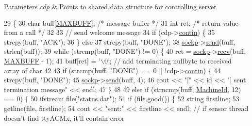 \begin{DoxyParams}{Parameters}
{\em cdp} & Points to shared data structure for controlling server \\
\hline
\end{DoxyParams}

\begin{DoxyCode}
29                                           \{
30   \textcolor{keywordtype}{char} buff[\hyperlink{Worker_8cpp_a0c8dad16ba61ded55d3f302a616c0ced}{MAXBUFF}]; \textcolor{comment}{/* message buffer */}
31   \textcolor{keywordtype}{int} ret; \textcolor{comment}{/* return value from a call */}
32 
33   \textcolor{comment}{// send welcome message}
34   \textcolor{keywordflow}{if} (cdp->\hyperlink{structControlData_ac8fbf80345423cf5650ae64bfb10dc88}{contin}) \{
35     strcpy(buff, \textcolor{stringliteral}{"ACK"});
36   \} \textcolor{keywordflow}{else}
37     strcpy(buff, \textcolor{stringliteral}{"DONE"});
38   \hyperlink{classWorker_a4562eb405aea20c7ac8a552e2075898f}{sockp}->\hyperlink{classSocket_aca3e5b9c5459a50bd8fb03d29ef9e48e}{send}(buff, strlen(buff));
39   \textcolor{keywordflow}{while} (strcmp(buff, \textcolor{stringliteral}{"DONE"}) != 0) \{
40     ret = \hyperlink{classWorker_a4562eb405aea20c7ac8a552e2075898f}{sockp}->\hyperlink{classSocket_a1830972b26797cde234054f81f0921de}{recv}(buff, \hyperlink{Worker_8cpp_a0c8dad16ba61ded55d3f302a616c0ced}{MAXBUFF} - 1);
41     buff[ret] = \textcolor{charliteral}{'\(\backslash\)0'}; \textcolor{comment}{// add terminating nullbyte to received array of char}
42 
43     \textcolor{keywordflow}{if} (strcmp(buff, \textcolor{stringliteral}{"DONE"}) == 0 || !cdp->\hyperlink{structControlData_ac8fbf80345423cf5650ae64bfb10dc88}{contin}) \{
44       strcpy(buff, \textcolor{stringliteral}{"DONE"});
45       \hyperlink{classWorker_a4562eb405aea20c7ac8a552e2075898f}{sockp}->\hyperlink{classSocket_aca3e5b9c5459a50bd8fb03d29ef9e48e}{send}(buff, 4);
46       cout << \textcolor{stringliteral}{"["} << \textcolor{keywordtype}{id} << \textcolor{stringliteral}{"] sent termination message"} << endl;
47     \}
48 
49     \textcolor{keywordflow}{else} \textcolor{keywordflow}{if} (strncmp(buff, \hyperlink{classWorker_a65e32331f68eabacf35ccad5f7cf127e}{MachineId}, 12) == 0) \{
50       ifstream file(\textcolor{stringliteral}{"status.dat"});
51       \textcolor{keywordflow}{if} (file.good()) \{
52         \textcolor{keywordtype}{string} firstline;
53         getline(file, firstline);
54         cout << \textcolor{stringliteral}{"sent:"} << firstline << endl; \textcolor{comment}{// if sensor thread doesn't find ttyACMx, it'll contain error
}
\end{DoxyCode}
